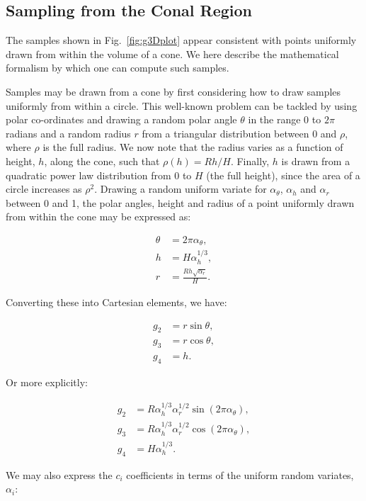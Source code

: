 \subsection{Sampling from the Conal Region}

The samples shown in Fig.~\ref{fig:g3Dplot} appear consistent with points
uniformly drawn from within the volume of a cone. We here describe the
mathematical formalism by which one can compute such samples.

Samples may be drawn from a cone by first considering how to draw samples
uniformly from within a circle. This well-known problem can be tackled by
using polar co-ordinates and drawing a random polar angle $\theta$ in the range
$0$ to $2\pi$ radians and a random radius $r$ from a triangular distribution
between $0$ and $\rho$, where $\rho$ is the full radius. We now note that the
radius varies as a function of height, $h$, along the cone, such that 
$\rho(h) = R h/H$. Finally, $h$ is drawn from a quadratic power law
distribution from $0$ to $H$ (the full height), since the area of a circle 
increases as $\rho^2$. Drawing a random uniform variate for $\alpha_{\theta}$,
$\alpha_h$ and $\alpha_r$ between 0 and 1, the polar angles, height and radius
of a point uniformly drawn from within the cone may be expressed as:

\begin{align}
\theta &= 2 \pi \alpha_{\theta},\\
h &= H \alpha_h^{1/3},\\
r &= \frac{ R h \sqrt{\alpha_r} }{ H }.
\end{align}

Converting these into Cartesian elements, we have:

\begin{align}
g_2 &= r \sin \theta,\\
g_3 &= r \cos \theta,\\
g_4 &= h.
\end{align}

Or more explicitly:

\begin{align}
g_2 &= R \alpha_h^{1/3} \alpha_r^{1/2} \sin ( 2 \pi \alpha_{\theta} ),\\
g_3 &= R \alpha_h^{1/3} \alpha_r^{1/2} \cos ( 2 \pi \alpha_{\theta} ),\\
g_4 &= H \alpha_h^{1/3} .
\end{align}

We may also express the $c_i$ coefficients in terms of the uniform random
variates, $\alpha_i$:

